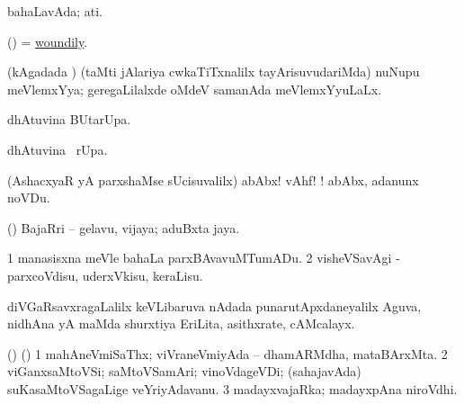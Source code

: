 \bentry
{} 
\gl{\gu}
\expl{}
\bmng
bahaLavAda; ati. 
\emng
\eentry

\bentry
{} 
\gl{\kirxvi}
\expl{}
\bmng
(\pArxparx) = \hyperlink{woundily}{woundily}. 
\emng
\eentry

\bentry
{} 
\gl{\gu}
\expl{}
\bmng
(kAgadada \vi) (taMti jAlariya cwkaTiTxnalilx tayArisuvudariMda) nuNupu meVlemxYya; geregaLilalxde oMdeV samanAda meVlemxYyuLaLx. 
\emng
\eentry

\bentry
{} 
\gl{\kirx}
\expl{}
\bmng
{} dhAtuvina BUtarUpa. 
\emng
\eentry

\bentry
{} 
\gl{\kirx}
\expl{}
\bmng
{} dhAtuvina \BUkaq\ rUpa. 
\emng
\eentry

\bentry
{} 
\gl{\BAavayx}
\expl{}
\bmng
(AshacxyaR yA parxshaMse sUcisuvalilx) abAbx! vAhf! !  abAbx, adanunx noVDu. 
\emng
\eentry

\bentry
{} 
\gl{\nA}
\expl{}
\bmng
(\ashi) BajaRri -- gelavu, vijaya; aduBxta jaya. 
\emng
\eentry

\bentry
{} 
\gl{\sakirx}
\expl{}
\bmng
\bnum
\num{1} manasisxna meVle bahaLa parxBAvavuMTumADu. 
\num{2} visheVSavAgi -parxcoVdisu, uderxVkisu, keraLisu. 
\enum
\emng
\eentry

\bentry
{} 
\gl{\nA}
\expl{}
\bmng
diVGaRsavxragaLalilx keVLibaruva nAdada punarutApxdaneyalilx Aguva, nidhAna yA maMda shurxtiya EriLita, asithxrate, cAMcalayx. 
\emng
\eentry

\bentry
{} 
\gl{\nA}
\expl{}
\bmng
(\AseTxrXV) (\ashi) 
\bnum
\num{1} mahAneVmiSaThx; viVraneVmiyAda -- dhamARMdha, mataBArxMta. 
\num{2} viGanxsaMtoVSi; saMtoVSamAri; vinoVdageVDi; (sahajavAda) suKasaMtoVSagaLige veYriyAdavanu. 
\num{3} madayxvajaRka; madayxpAna niroVdhi. 
\enum
\emng
\eentry

\bentry
{} 
\gl{\saMkiSx}
\expl{}
\bmng
{}  
\emng
\eentry

\bentry
{} 
\gl{\saMkiSx}
\expl{}
\bmng
{} 
\emng
\eentry

\bentry
{} 
\gl{\saMkiSx}
\expl{}
\bmng
{} 
\emng
\eentry

